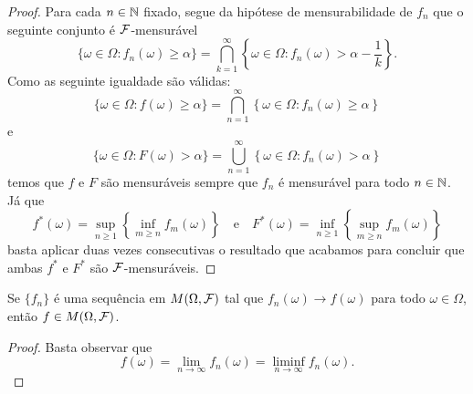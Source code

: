 \begin{proof}
Para cada $n\in\mathbb{N}$ fixado, segue da 
hipótese de mensurabilidade de $f_n$ que 
o seguinte conjunto é $\mathcal{F}$-mensurável
\[
\{\omega\in\Omega: f_n(\omega)\geq \alpha\}
=
\bigcap_{k=1}^{\infty}
\left\{
	\omega\in\Omega: f_n(\omega)>\alpha-\frac{1}{k} 
\right\}. 
\]
Como as seguinte igualdade são válidas:
	\[	
	\{\omega\in\Omega: f(\omega)\geq \alpha\} 
	=
	\bigcap_{n=1}^{\infty}
	\left\{
		\omega\in\Omega: f_n(\omega)\geq \alpha 
	\right\}
	\]
e
 	\[
 	\{\omega\in\Omega: F(\omega)> \alpha\} 
	=
	\bigcup_{n=1}^{\infty}
	\left\{
		\omega\in\Omega: f_n(\omega)> \alpha 
	\right\}
	\]
temos que $f$ e $F$ são mensuráveis sempre que $f_n$
é mensurável para todo $n\in\mathbb{N}$.
Já que 
	\[	
	f^*(\omega)
	=
	\sup_{n\geq 1}
	\left\{ \inf_{m\geq n} f_{m}(\omega) \right\}
	\quad
	\text{e}
	\quad
	F^*(\omega)
	=
	\inf_{n\geq 1}
	\left\{ \sup_{m\geq n} f_{m}(\omega) \right\}
	\]
basta aplicar duas vezes consecutivas o resultado que acabamos 
para concluir que ambas $f^*$ e $F^*$ são $\mathcal{F}$-mensuráveis.
\end{proof}




\begin{corolario}
Se $\{f_n\}$ é uma sequência em $M(\Omega,\mathcal{F})$ tal que
$f_n(\omega)\to f(\omega)$ para todo $\omega\in\Omega$,
então $f\in M(\Omega,\mathcal{F})$.
\end{corolario} 

\begin{proof}
	Basta observar que 
		\[
			f(\omega) 
			=\lim_{n\to\infty} f_n(\omega)
			=\liminf_{n\to\infty} f_n(\omega).
		\]
\end{proof}
